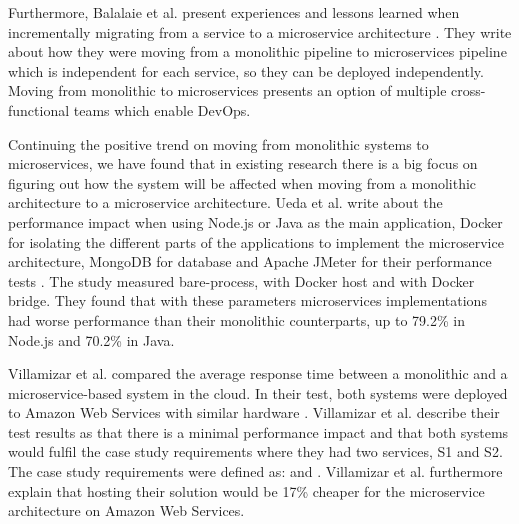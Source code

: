 \documentclass[a4paper,oneside]{bth}
\begin{document}
\par\vspace {0.5cm}

Furthermore, Balalaie et al. present experiences and lessons learned when incrementally migrating from a service to a microservice architecture \cite{Balalaie}. They write about how they were moving from a monolithic pipeline to microservices pipeline which is independent for each service, so they can be deployed independently. Moving from monolithic to microservices presents an option of multiple cross-functional teams which enable DevOps.

\par\vspace {0.5cm}

Continuing the positive trend on moving from monolithic systems to microservices, we have found that in existing research there is a big focus on figuring out how the system will be affected when moving from a monolithic architecture to a microservice architecture. Ueda et al. write about the performance impact when using Node.js or Java as the main application, Docker for isolating the different parts of the applications to implement the microservice architecture, MongoDB for database and Apache JMeter for their performance tests \cite{Ueda}. The study measured bare-process, with Docker host and with Docker bridge. They found that with these parameters microservices implementations had worse performance than their monolithic counterparts, up to 79.2\% in Node.js and 70.2\% in Java.

\par\vspace {0.5cm}

Villamizar et al. compared the average response time between a monolithic and a microservice-based system in the cloud. In their test, both systems were deployed to Amazon Web Services with similar hardware \cite{Villamizar}. Villamizar et al. describe their test results as that there is a minimal performance impact and that both systems would fulfil the case study requirements where they had two services, S1 and S2. The case study requirements were defined as:  and . Villamizar et al. furthermore explain that hosting their solution would be 17\% cheaper for the microservice architecture on Amazon Web Services.

\par\vspace {0.5cm}
\end{document}
